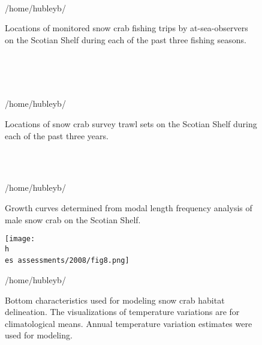 \documentclass[11pt]{article}
\newcommand{\D}{.}
\newcommand{\h}{/home/hubleyb/}
\newcommand{\es}{bio.data/bio.snowcrab/}
\begin{document}
\begin{figure}
    \centering
   \\
  \\
    \\
  \caption{Locations of monitored snow crab fishing trips by at-sea-observers on the Scotian Shelf during each of the past three fishing seasons.}

\h \end{figure}
\clearpage
\begin{figure}
    \centering
  \\
    \\
      \\
\caption{Locations of snow crab survey trawl sets on the Scotian Shelf during each of the past three years.}

\h \end{figure}
\clearpage
\begin{figure}
    \centering
   \\
\\
\caption{Growth curves determined from modal length frequency analysis of male snow crab on the Scotian Shelf.}

\h \end{figure}
\clearpage
\begin{figure}
    \centering
\texttt{[image: \\h \\es assessments/2008/fig8.png]}\

\caption{Bottom characteristics used for modeling snow crab habitat delineation. The visualizations of temperature variations are for climatological means. Annual temperature variation estimates were used for modeling.}

\h \end{figure}
\clearpage
\end{document}

